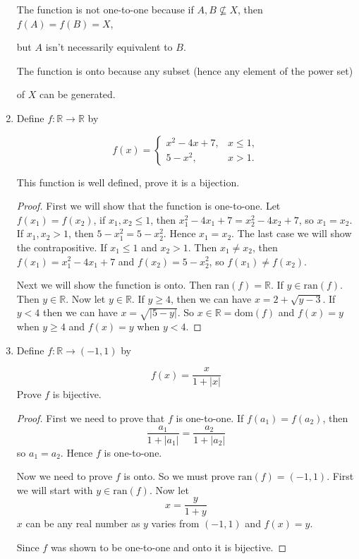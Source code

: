 \documentclass[12pt]{article}
\begin{document}
\begin{enumerate}
		\qquad The function is not one-to-one because if $A,B\not\subseteq X$, then $f(A)=f(B)=X$, 
		
		\qquad but $A$ isn't necessarily equivalent to $B$.
		
		\qquad The function is onto because any subset (hence any element of the power set) 
		
		\qquad of $X$ can be generated.
		
		\item Define $f:\mathbb{R}\to\mathbb{R}$ by
		
		\[ f(x)=\begin{cases}
		x^2-4x+7, &x\leq1,\\
		5-x^2, &x>1.
		\end{cases}
		\]
		
		\noindent This function is well defined, prove it is a bijection.
		
		\begin{proof}
			First we will show that the function is one-to-one. Let $f(x_1)=f(x_2)$, if $x_1,x_2\leq1$, then $x_1^2-4x_1+7=x_2^2-4x_2+7$, so $x_1=x_2$. If $x_1,x_2>1$, then $5-x_1^2=5-x_2^2$. Hence $x_1=x_2$. The last case we will show the contrapositive. If $x_1\leq1$ and $x_2>1$. Then $x_1\neq x_2$, then $f(x_1)=x_1^2-4x_1+7$ and $f(x_2)=5-x_2^2$, so $f(x_1)\neq f(x_2)$.
			
			Next we will show the function is onto. Then $\text{ran}(f)=\mathbb{R}$. If $y\in \text{ran}(f)$. Then $y\in \mathbb{R}$. Now let $y\in\mathbb{R}$. If $y\geq4$, then we can have $x=2+\sqrt{y-3}$. If $y<4$ then we can have $x=\sqrt{|5-y|}$. So $x\in\mathbb{R}=\text{dom}(f)$ and $f(x)=y$ when $y\geq4$ and $f(x)=y$ when $y<4$.
		\end{proof}
	
		\item Define $f:\mathbb{R}\to(-1,1)$ by
		
		\[
			f(x)=\frac{x}{1+|x|}
		\]
		Prove $f$ is bijective.
		
		\begin{proof}
			First we need to prove that $f$ is one-to-one. If $f(a_1)=f(a_2)$, then
			\[
			\frac{a_1}{1+|a_1|}=\frac{a_2}{1+|a_2|}
			\]
			so $a_1=a_2$. Hence $f$ is one-to-one.
			
			Now we need to prove $f$ is onto. So we must prove $\text{ran}(f)=(-1,1)$. First we will start with $y\in\text{ran}(f)$. Now let
			\[
			x=\frac{y}{1+y}
			\]
			$x$ can be any real number as $y$ varies from $(-1,1)$ and $f(x)=y$.
			
			Since $f$ was shown to be one-to-one and onto it is bijective.
		\end{proof}
		
		\end{enumerate}
\end{document}
